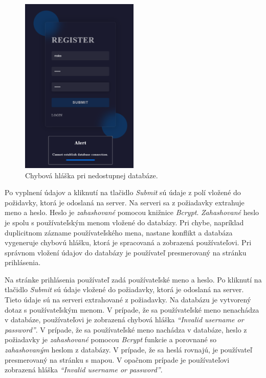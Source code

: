 \begin{figure}[H]
  \centering
  \includegraphics[width=0.5\textwidth]{img/auth/database_error.png}
  \caption{Chybová hláška pri nedostupnej databáze.}
  \label{fig:database_error}
\end{figure}

Po vyplnení údajov a kliknutí na tlačidlo \textit{Submit} sú údaje z polí vložené do požidavky, ktorá je odoslaná na server. Na serveri sa z požiadavky extrahuje meno a heslo. Heslo je \textit{zahashované} pomocou knižnice \textit{Bcrypt}\cite{nodejs-bcrypt}. \textit{Zahashované} heslo je spolu s používateľským menom vložené do databázy. Pri chybe, napríklad duplicitnom zázname používateľského mena, nastane konflikt a databáza vygeneruje chybovú hlášku, ktorá je spracovaná a zobrazená používateľovi. Pri správnom vložení údajov do databázy je používateľ presmerovaný na stránku prihlásenia.

Na stránke prihlásenia používateľ zadá používateľské meno a heslo. Po kliknutí na tlačidlo \textit{Submit} sú údaje vložené do požiadavky, ktorá je odoslaná na server. Tieto údaje sú na serveri extrahované z požiadavky. Na databázu je vytvorený dotaz s používateľským menom. V prípade, že sa používateľské meno nenachádza v databáze, používateľovi je zobrazená chybová hláška \textit{``Invalid username or password''}. V prípade, že sa používateľské meno nachádza v databáze, heslo z požiadavky je \textit{zahashované} pomocou \textit{Bcrypt} funkcie a porovnané so \textit{zahashovaným} heslom z databázy. V prípade, že sa heslá rovnajú, je používateľ presmerovaný na stránku s mapou. V opačnom prípade je používateľovi zobrazená hláška \textit{``Invalid username or password''}.


